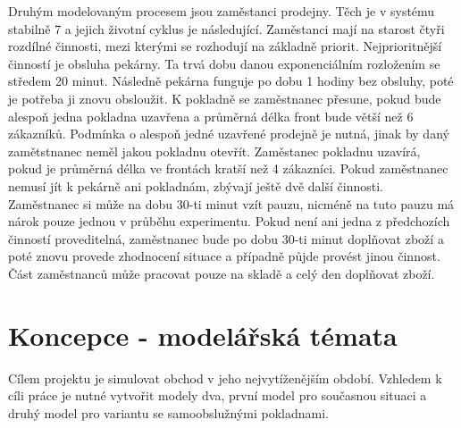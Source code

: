 \documentclass[12pt,a4paper,titlepage]{article}
\begin{document}
Druhým modelovaným procesem jsou zaměstanci prodejny. Těch je v systému stabilně 7 a jejich životní cyklus je následující. Zaměstanci mají na starost čtyři rozdílné činnosti, mezi kterými se rozhodují na základně priorit. Nejprioritnější činností je obsluha pekárny. Ta trvá dobu danou exponenciálním rozložením se středem 20 minut. Následně pekárna funguje po dobu 1 hodiny bez obsluhy, poté je potřeba ji znovu obsloužit. K pokladně se zaměstnanec přesune, pokud bude alespoň jedna pokladna uzavřena a průměrná délka front bude větší než 6 zákazníků. Podmínka o alespoň jedné uzavřené prodejně je nutná, jinak by daný zamětstnanec neměl jakou pokladnu otevřít. Zaměstanec pokladnu uzavírá, pokud je průměrná délka ve frontách kratší než 4 zákazníci. Pokud zaměstnanec nemusí jít k pekárně ani pokladnám, zbývají ještě dvě další činnosti. Zaměstnanec si může na dobu 30-ti minut vzít pauzu, nicméně na tuto pauzu má nárok pouze jednou v průběhu experimentu. Pokud není ani jedna z předchozích činností proveditelná, zaměstnanec bude po dobu 30-ti minut doplňovat zboží a poté znovu provede zhodnocení situace a případně půjde provést jinou činnost. Část zaměstnanců může pracovat pouze na skladě a celý den doplňovat zboží.

\section{Koncepce - modelářská témata}
Cílem projektu je simulovat obchod v jeho nejvytíženějším období. Vzhledem k cíli práce je nutné vytvořit modely dva, první model pro současnou situaci a druhý model pro variantu se samoobslužnými pokladnami. 
\end{document}

